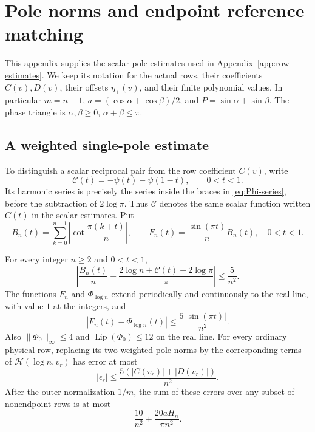 \section{Pole norms and endpoint reference matching}
\label{app:pole-estimates}

This appendix supplies the scalar pole estimates used in
Appendix~\ref{app:row-estimates}.  We keep its notation for the actual
rows, their coefficients $C(v),D(v)$, their offsets $\eta_\pm(v)$,
and their finite polynomial values.  In particular
$m=n+1$, $a=(\cos\alpha+\cos\beta)/2$, and
$P=\sin\alpha+\sin\beta$.  The phase triangle is
$\alpha,\beta\geq0$, $\alpha+\beta\leq\pi$.

\subsection{A weighted single-pole estimate}

To distinguish a scalar reciprocal pair from the row coefficient
$C(v)$, write
\begin{equation}\label{eq:pole-reciprocal-pair}
 \mathcal C(t)=-\psi(t)-\psi(1-t),\qquad 0<t<1.
\end{equation}
Its harmonic series is precisely the series inside the braces in
\eqref{eq:Phi-series}, before the subtraction of $2\log\pi$.
Thus $\mathcal C$ denotes the same scalar function written $C(t)$
in the scalar estimates.  Put
\[
 B_n(t)=\sum_{k=0}^{n-1}\left|\cot\frac{\pi(k+t)}n\right|,
 \qquad F_n(t)=\frac{\sin(\pi t)}nB_n(t),\quad 0<t<1.
\]

\begin{lemma}
\label{lem:weighted-single-pole}
For every integer $n\geq2$ and $0<t<1$,
\begin{equation}\label{eq:pole-norm-error}
 \left|\frac{B_n(t)}n-
 \frac{2\log n+\mathcal C(t)-2\log\pi}{\pi}\right|
       \leq\frac5{n^2}.
\end{equation}
The functions $F_n$ and $\Phi_{\log n}$ extend periodically and
continuously to the real line, with value $1$ at the integers, and
\begin{equation}\label{eq:pole-weighted-error}
 |F_n(t)-\Phi_{\log n}(t)|
       \leq\frac{5|\sin(\pi t)|}{n^2}.
\end{equation}
Also $\|\Phi_0\|_\infty\leq4$ and
$\operatorname{Lip}(\Phi_0)\leq12$ on the real line.
For every ordinary physical row, replacing its two weighted pole norms
by the corresponding terms of $\mathcal H(\log n,v_r)$ has error
at most
\begin{equation}\label{eq:pole-row-error}
 |\epsilon_r|\leq\frac{5(|C(v_r)|+|D(v_r)|)}{n^2}.
\end{equation}
After the outer normalization $1/m$, the sum of these errors over any
subset of nonendpoint rows is at most
\begin{equation}\label{eq:pole-total-error}
 \frac{10}{n^2}+\frac{20aH_n}{\pi n^2}.
\end{equation}
\end{lemma}

